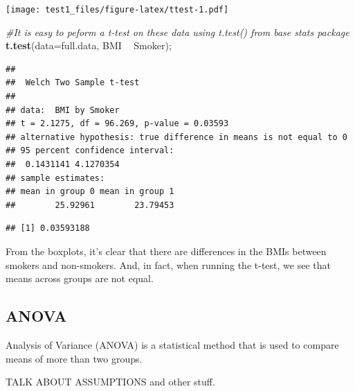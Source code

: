 \documentclass[
]{book}
\newenvironment{Shaded}{\begin{snugshade}}{\end{snugshade}}
\newcommand{\CommentTok}[1]{\textcolor[rgb]{0.56,0.35,0.01}{\textit{#1}}}
\newcommand{\DataTypeTok}[1]{\textcolor[rgb]{0.13,0.29,0.53}{#1}}
\newcommand{\KeywordTok}[1]{\textcolor[rgb]{0.13,0.29,0.53}{\textbf{#1}}}
\newcommand{\NormalTok}[1]{#1}
\newcommand{\OperatorTok}[1]{\textcolor[rgb]{0.81,0.36,0.00}{\textbf{#1}}}
\newcommand{\StringTok}[1]{\textcolor[rgb]{0.31,0.60,0.02}{#1}}
\begin{document}
\texttt{[image: test1\_files/figure-latex/ttest-1.pdf]}

\begin{Shaded}
\begin{Highlighting}[]
\CommentTok{#It is easy to peform a t-test on these data using t.test() from base stats package}
\KeywordTok{t.test}\NormalTok{(}\DataTypeTok{data=}\NormalTok{full.data, BMI }\OperatorTok{~}\StringTok{ }\NormalTok{Smoker);}
\end{Highlighting}
\end{Shaded}

\begin{verbatim}
## 
##  Welch Two Sample t-test
## 
## data:  BMI by Smoker
## t = 2.1275, df = 96.269, p-value = 0.03593
## alternative hypothesis: true difference in means is not equal to 0
## 95 percent confidence interval:
##  0.1431141 4.1270354
## sample estimates:
## mean in group 0 mean in group 1 
##        25.92961        23.79453
\end{verbatim}

\begin{Shaded}
\end{Shaded}

\begin{verbatim}
## [1] 0.03593188
\end{verbatim}

From the boxplots, it's clear that there are differences in the BMIs between smokers and non-smokers. And, in fact, when running the t-test, we see that means across groups are not equal.

\hypertarget{anova}{%
\subsection{ANOVA}\label{anova}}

Analysis of Variance (ANOVA) is a statistical method that is used to compare means of more than two groups.

TALK ABOUT ASSUMPTIONS and other stuff.
\end{document}
